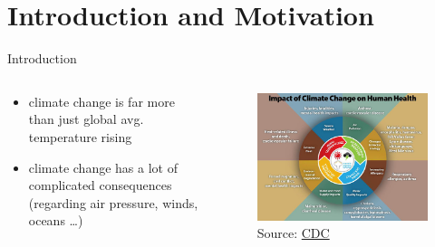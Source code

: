 \section[Intro]{Introduction and Motivation}
\begin{frame}{Introduction}
\begin{columns}
  \begin{column}{.5 \textwidth}
    \begin{itemize}
      \item climate change is far more than just global avg. temperature rising 
      \item climate change has a lot of complicated consequences (regarding air pressure, winds, oceans \dots)  
    \end{itemize}
    
    
  \end{column}
  \begin{column}{.5 \textwidth}
    \begin{figure}[t]
      \centering
      \includegraphics[width=.9 \columnwidth]{imglib/climate_change_health_impacts.jpg}
      {\tiny
        Source: \href{https://www.cdc.gov/climateandhealth/effects/default.htm}{CDC} 
      }    
    \end{figure}
    
  \end{column}
  
\end{columns}
\end{frame}

